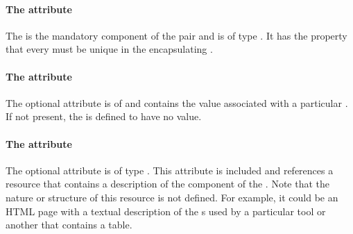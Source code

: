 \paragraph{The  attribute}
The  is the mandatory component of the \KeyValuePair pair and is of type . It has the property that every  must be unique in the encapsulating \ListOfKeyValuePairs.

\paragraph{The  attribute}
The optional  attribute is of  and contains the value associated with a particular . If not present, the \KeyValuePair is defined to have no value.

\paragraph{The  attribute}
The optional attribute  is of type . This attribute is included and references a resource that contains a description of the  component of the \KeyValuePair. Note that the nature or structure of this resource is not defined. For example, it could be an HTML page with a textual description of the s used by a particular tool or another that contains a table.



